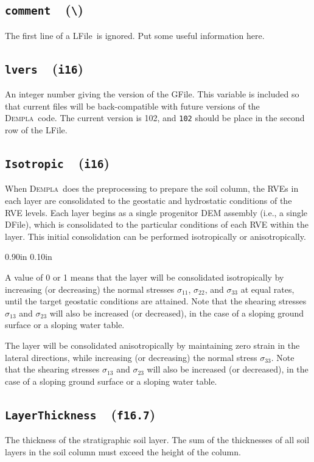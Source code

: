 \documentclass[letterpaper,11pt]{article}
\newcommand{\Dempla}{\textsc{Dempla}}
\newcommand{\Var}[2]{\texttt{#1}\ \  (\texttt{#2})}
\newcommand{\DFile}{\textsf{DFile}}
\newcommand{\GFile}{\textsf{GFile}}
\newcommand{\LFile}{\textsf{LFile}}
\newlength{\Labelwidth}
\newcommand{\Entrylabel}[1]{\makebox[\Labelwidth][r]{\texttt{#1}}}
\newenvironment{Options}
{\begin{list}{}{%
\renewcommand{\makelabel}{\Entrylabel}%
\setlength{\leftmargin} {0.90in}%
\setlength{\rightmargin}{0.00in}%
\setlength{\labelsep}   {0.10in}%
\setlength{\labelwidth} {\Labelwidth}%
}}
{\end{list}}
\begin{document}
\subsection[\texttt{comment}]{\Var{comment}{\textbackslash}}
The first line of a \LFile\ is ignored.
Put some useful information here.
%
\subsection[\texttt{lvers}]{\Var{lvers}{i16}}%
\label{sec:lvers}
An integer number giving the version of the \GFile.
This variable is included so that current files
will be back-compatible with future versions
of the \Dempla\ code.
The current version is 102,
and \texttt{102} should be place in the second row of the \LFile.
%
\subsection[\texttt{Isotropic}]{\Var{Isotropic}{i16}}%
\label{sec:Isotropic}
When \Dempla\ does the preprocessing to prepare the soil
column,
the RVEs in each layer are consolidated to the
geostatic and hydrostatic conditions of the RVE levels.
Each layer begins as a single progenitor DEM assembly
(i.e., a single \DFile),
which is consolidated to the particular conditions
of each RVE within the layer.
This initial consolidation can be performed isotropically
or anisotropically.
%
\begin{Options}
  \item[Isotropic=0,1]
    A value of 0 or 1 means that
    the layer will be consolidated isotropically by 
    increasing (or decreasing) the normal stresses
    $\sigma_{11}$, $\sigma_{22}$, and $\sigma_{33}$
    at equal rates, until the target geostatic
    conditions are attained.
    Note that the shearing stresses
    $\sigma_{13}$ and $\sigma_{23}$ will also
    be increased (or decreased), in the case of
    a sloping ground surface or a sloping water table.
  \item[Isotropic=2]
    The layer will be consolidated anisotropically by
    maintaining zero strain in the lateral directions,
    while 
    increasing (or decreasing) the normal stress
    $\sigma_{33}$.
    Note that the shearing stresses
    $\sigma_{13}$ and $\sigma_{23}$ will also
    be increased (or decreased), in the case of
    a sloping ground surface or a sloping water table.
\end{Options}
%
\subsection[\texttt{LayerThickness}]{\Var{LayerThickness}{f16.7}}%
\label{sec:LayerThickness}
The thickness of the stratigraphic soil layer.
The sum of the thicknesses of all soil layers in the soil column
must exceed the height of the column.
%
\end{document}
